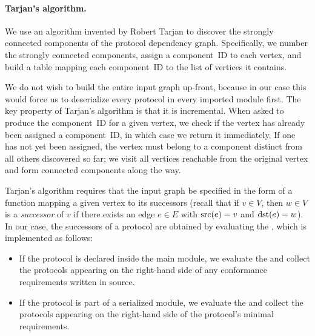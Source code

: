 \documentclass[../generics]{subfiles}
\begin{document}
\paragraph{Tarjan's algorithm.} We use an algorithm invented by Robert Tarjan \cite{tarjan} to discover the strongly connected components of the protocol dependency graph. Specifically, we number the strongly connected components, assign a component~ID to each vertex, and build a table mapping each component~ID to the list of vertices it contains.

We do not wish to build the entire input graph up-front, because in our case this would force us to deserialize every protocol in every imported module first. The key property of Tarjan's algorithm is that it is incremental. When asked to produce the component~ID for a given vertex, we check if the vertex has already been assigned a component~ID, in which case we return it immediately. If one has not yet been assigned, the vertex must belong to a component distinct from all others discovered so far; we visit all vertices reachable from the original vertex and form connected components along the way.

Tarjan's algorithm requires that the input graph be specified in the form of a function mapping a given vertex to its successors (recall that if $v\in V$, then $w\in V$ is a \emph{successor} of $v$ if there exists an edge $e\in E$ with $\operatorname{src}(e)=v$ and $\operatorname{dst}(e)=w$). In our case, the successors of a protocol are obtained by evaluating the , which is implemented as follows:
\begin{itemize}
\item If the protocol is declared inside the main module, we evaluate the  and collect the protocols appearing on the right-hand side of any conformance requirements written in source.

\item If the protocol is part of a serialized module, we evaluate the  and collect the protocols appearing on the right-hand side of the protocol's minimal requirements.
\end{itemize}
\end{document}
